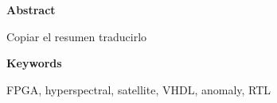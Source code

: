 
\newpage

\thispagestyle{empty}

\begin{center}

{\bf \Huge Abstract}

  \end{center}
\vspace{1cm}

Copiar el resumen traducirlo

\vspace{1cm}

\begin{center}

{\bf \Large Keywords}

   \end{center}

   \vspace{0.5cm}
   
   FPGA, hyperspectral, satellite, VHDL, anomaly, RTL
   


